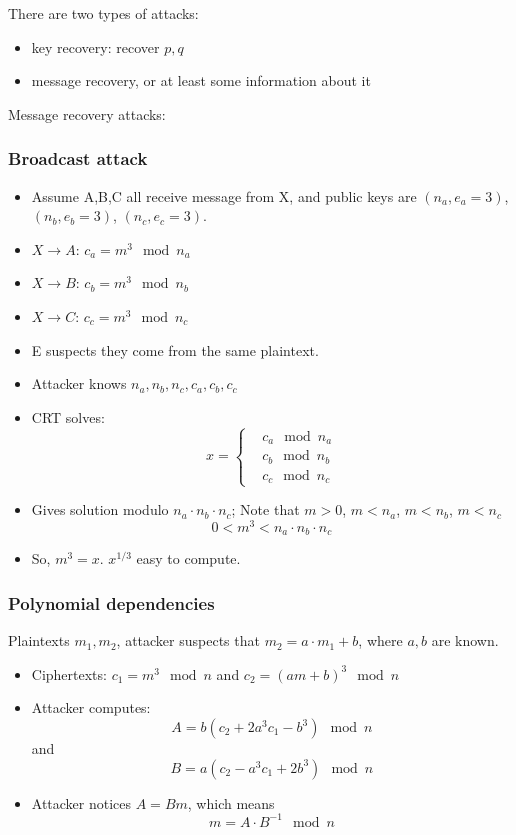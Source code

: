 \documentclass[language=english,number=]{homework}
\begin{document}
    There are two types of attacks:
    \begin{itemize}
        \item key recovery: recover $p,q$
        \item message recovery, or at least some information about it
    \end{itemize}

    Message recovery attacks:

    \subsubsection{Broadcast attack}

    \begin{itemize}
        \item Assume A,B,C all receive message from X, and public keys are $(n_a,e_a=3)$, $(n_b,e_b=3)$, $(n_c,e_c=3)$.
        \item $X \to A$: $c_a = m^3 \mod n_a$
        \item $X \to B$: $c_b = m^3 \mod n_b$
        \item $X \to C$: $c_c = m^3 \mod n_c$
        \item E suspects they come from the same plaintext.
        \item Attacker knows $n_a, n_b, n_c, c_a, c_b, c_c$
        \item CRT solves:
        \[
            x = \begin{cases}
                &c_a \mod n_a \\
                    &c_b \mod n_b \\
                    &c_c \mod n_c
            \end{cases}
        \]
        \item Gives solution modulo $n_a \cdot n_b \cdot n_c$;
        Note that $m > 0$, $m < n_a$, $m < n_b$, $m < n_c$
        \[
            0 < m^3 < n_a \cdot n_b \cdot n_c
        \]
        \item So, $m^3 = x$.
        $x^{1/3}$ easy to compute.
    \end{itemize}

    \subsubsection{Polynomial dependencies}

    Plaintexts $m_1, m_2$, attacker suspects that $m_2 = a \cdot m_1 + b$, where $a,b$ are known.
    \begin{itemize}
        \item Ciphertexts: $c_1 = m^3 \mod n$ and $c_2 = (a m + b)^3 \mod n$
        \item Attacker computes:
        \[
            A = b (c_2 + 2a^3 c_1 - b^3) \mod n
        \]
        and
        \[
            B = a (c_2 - a^3 c_1 + 2b^3) \mod n
        \]
        \item Attacker notices $A = Bm$, which means
        \[
            m = A \cdot B^{-1} \mod n
        \]
    \end{itemize}
\end{document}
